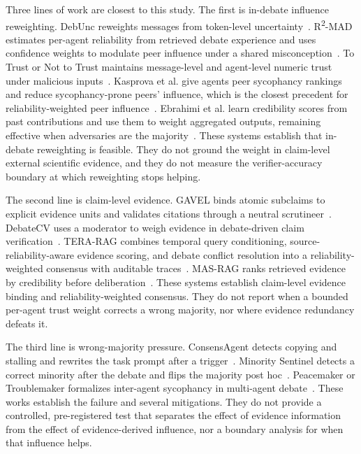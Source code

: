 Three lines of work are closest to this study. The first is in-debate influence reweighting. DebUnc reweights messages from token-level uncertainty~\cite{yoffe-etal-2025-debunc}. R\textsuperscript{2}-MAD estimates per-agent reliability from retrieved debate experience and uses confidence weights to modulate peer influence under a shared misconception~\cite{jin2026r2mad}. To Trust or Not to Trust maintains message-level and agent-level numeric trust under malicious inputs~\cite{he2026trust}. Kasprova et al. give agents peer sycophancy rankings and reduce sycophancy-prone peers' influence, which is the closest precedent for reliability-weighted peer influence~\cite{kasprova2026polite}. Ebrahimi et al. learn credibility scores from past contributions and use them to weight aggregated outputs, remaining effective when adversaries are the majority~\cite{ebrahimi2025adversary}. These systems establish that in-debate reweighting is feasible. They do not ground the weight in claim-level external scientific evidence, and they do not measure the verifier-accuracy boundary at which reweighting stops helping.

The second line is claim-level evidence. GAVEL binds atomic subclaims to explicit evidence units and validates citations through a neutral scrutineer~\cite{xu2026gavel}. DebateCV uses a moderator to weigh evidence in debate-driven claim verification~\cite{he2026debatecv}. TERA-RAG combines temporal query conditioning, source-reliability-aware evidence scoring, and debate conflict resolution into a reliability-weighted consensus with auditable traces~\cite{truong2026terarag}. MAS-RAG ranks retrieved evidence by credibility before deliberation~\cite{kushwaha2026agentbased}. These systems establish claim-level evidence binding and reliability-weighted consensus. They do not report when a bounded per-agent trust weight corrects a wrong majority, nor where evidence redundancy defeats it.

The third line is wrong-majority pressure. ConsensAgent detects copying and stalling and rewrites the task prompt after a trigger~\cite{pitre-etal-2025-consensagent}. Minority Sentinel detects a correct minority after the debate and flips the majority post hoc~\cite{he2026minority}. Peacemaker or Troublemaker formalizes inter-agent sycophancy in multi-agent debate~\cite{yao2025peacemaker}. These works establish the failure and several mitigations. They do not provide a controlled, pre-registered test that separates the effect of evidence information from the effect of evidence-derived influence, nor a boundary analysis for when that influence helps.

